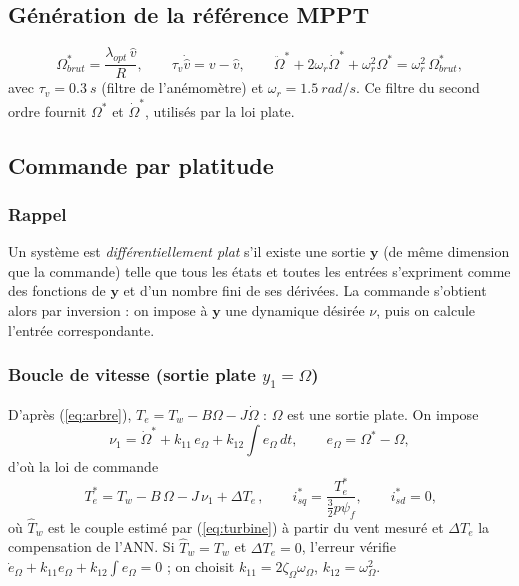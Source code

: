 \documentclass[11pt,a4paper]{article}
\theoremstyle{remark}
\newcommand{\vect}[1]{\bm{#1}}
\begin{document}
\subsection{Génération de la référence MPPT}
\begin{equation}
  \Omega^*_{brut} = \frac{\lambda_{opt}\,\hat v}{R}, \qquad
  \tau_v\dot{\hat v} = v - \hat v ,\qquad
  \ddot\Omega^* + 2\omega_r\dot\Omega^* + \omega_r^2\Omega^* = \omega_r^2\,\Omega^*_{brut},
\end{equation}
avec $\tau_v=\SI{0,3}{s}$ (filtre de l'anémomètre) et $\omega_r=\SI{1,5}{rad/s}$. Ce filtre
du second ordre fournit $\Omega^*$ et $\dot\Omega^*$, utilisés par la loi plate.

\subsection{Commande par platitude}

\subsubsection{Rappel}
Un système est \emph{différentiellement plat} s'il existe une sortie $\vect{y}$ (de même dimension
que la commande) telle que tous les états et toutes les entrées s'expriment comme des fonctions de
$\vect{y}$ et d'un nombre fini de ses dérivées. La commande s'obtient alors par inversion :
on impose à $\vect{y}$ une dynamique désirée $\nu$, puis on calcule l'entrée correspondante.

\subsubsection{Boucle de vitesse (sortie plate \texorpdfstring{$y_1=\Omega$}{y1 = Omega})}
D'après (\ref{eq:arbre}), $T_e = T_w - B\Omega - J\dot\Omega$ : $\Omega$ est une sortie plate.
On impose
\begin{equation}
  \nu_1 = \dot\Omega^* + k_{11}\,e_\Omega + k_{12}\!\int\! e_\Omega\,dt,
  \qquad e_\Omega = \Omega^* - \Omega ,
\end{equation}
d'où la loi de commande
\begin{equation}
  \boxed{\,T_e^* = \hat T_w - B\,\Omega - J\,\nu_1 + \Delta T_e\,}, \qquad
  i_{sq}^* = \frac{T_e^*}{\tfrac32 p\psi_f}, \qquad i_{sd}^* = 0,
  \label{eq:plat_vitesse}
\end{equation}
où $\hat T_w$ est le couple estimé par (\ref{eq:turbine}) à partir du vent mesuré et
$\Delta T_e$ la compensation de l'ANN. Si $\hat T_w = T_w$ et $\Delta T_e=0$, l'erreur vérifie
$\dot e_\Omega + k_{11}e_\Omega + k_{12}\int e_\Omega = 0$ ; on choisit
$k_{11}=2\zeta_\Omega\omega_\Omega$, $k_{12}=\omega_\Omega^2$.
\end{document}
